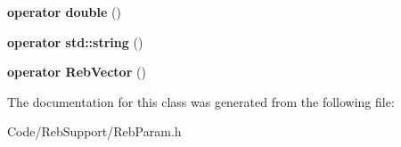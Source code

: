 \begin{DoxyCompactItemize}
\item 
{\bfseries operator double} ()\hypertarget{class_reb_param_af3fe52b2293f6724abdc71beb1d59a04}{}\label{class_reb_param_af3fe52b2293f6724abdc71beb1d59a04}

\item 
{\bfseries operator std\+::string} ()\hypertarget{class_reb_param_a9563afff7bd0bae11756f81eeddfc236}{}\label{class_reb_param_a9563afff7bd0bae11756f81eeddfc236}

\item 
{\bfseries operator Reb\+Vector} ()\hypertarget{class_reb_param_ab73376f858486796eac1d98e334d9f81}{}\label{class_reb_param_ab73376f858486796eac1d98e334d9f81}

\end{DoxyCompactItemize}


The documentation for this class was generated from the following file\+:\begin{DoxyCompactItemize}
\item 
Code/\+Reb\+Support/Reb\+Param.\+h\end{DoxyCompactItemize}
